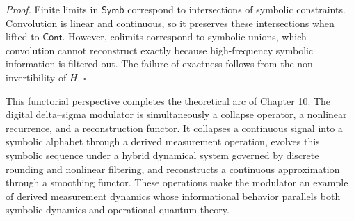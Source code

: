 \textit{Proof.}
Finite limits in $\mathsf{Symb}$ correspond to intersections of symbolic constraints. Convolution is linear and continuous, so it preserves these intersections when lifted to $\mathsf{Cont}$. However, colimits correspond to symbolic unions, which convolution cannot reconstruct exactly because high-frequency symbolic information is filtered out. The failure of exactness follows from the non-invertibility of $H$. \hfill $\square$

\medskip

This functorial perspective completes the theoretical arc of Chapter 10. The digital delta–sigma modulator is simultaneously a collapse operator, a nonlinear recurrence, and a reconstruction functor. It collapses a continuous signal into a symbolic alphabet through a derived measurement operation, evolves this symbolic sequence under a hybrid dynamical system governed by discrete rounding and nonlinear filtering, and reconstructs a continuous approximation through a smoothing functor. These operations make the modulator an example of derived measurement dynamics whose informational behavior parallels both symbolic dynamics and operational quantum theory.

\medskip

